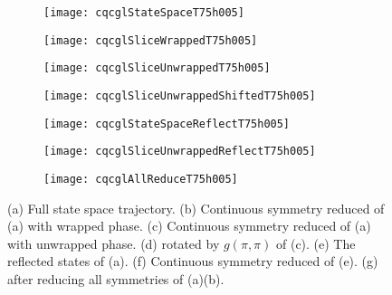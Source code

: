 \begin{figure}[h]
  \centering
  \begin{subfigure}{.23\linewidth}
    \centering
    \captionsetup{justification=centering}
    \caption{}
    \texttt{[image: cqcglStateSpaceT75h005]}
    \label{}
  \end{subfigure}
  \begin{subfigure}{.23\linewidth}
    \centering
    \captionsetup{justification=centering}
    \caption{}
    \texttt{[image: cqcglSliceWrappedT75h005]}
    \label{}
  \end{subfigure}
  \begin{subfigure}{.23\linewidth}
    \centering
    \captionsetup{justification=centering}
    \caption{}
    \texttt{[image: cqcglSliceUnwrappedT75h005]}
    \label{}
  \end{subfigure}
  \begin{subfigure}{.23\linewidth}
    \centering
    \captionsetup{justification=centering}
    \caption{}
    \texttt{[image: cqcglSliceUnwrappedShiftedT75h005]}
    \label{}
  \end{subfigure}
  \begin{subfigure}{.23\linewidth}
    \centering
    \captionsetup{justification=centering}
    \caption{}
    \texttt{[image: cqcglStateSpaceReflectT75h005]}
    \label{}
  \end{subfigure}
  \begin{subfigure}{.23\linewidth}
    \centering
    \captionsetup{justification=centering}
    \caption{}
    \texttt{[image: cqcglSliceUnwrappedReflectT75h005]}
    \label{}
  \end{subfigure}
  \begin{subfigure}{.23\linewidth}
    \centering
    \captionsetup{justification=centering}
    \caption{}
    \texttt{[image: cqcglAllReduceT75h005]}
    \label{}
  \end{subfigure}
  \caption{
    (a) Full state space trajectory.
    (b) Continuous symmetry reduced of (a) with wrapped phase.
    (c) Continuous symmetry reduced of (a) with unwrapped phase.
    (d) rotated by $g(\pi, \pi)$ of (c).
    (e) The reflected states of (a).
    (f) Continuous symmetry reduced of (e).
    (g) after reducing all symmetries of (a)(b).
  }
  \label{fig:cqcglReduceSymT75h005}
\end{figure}


